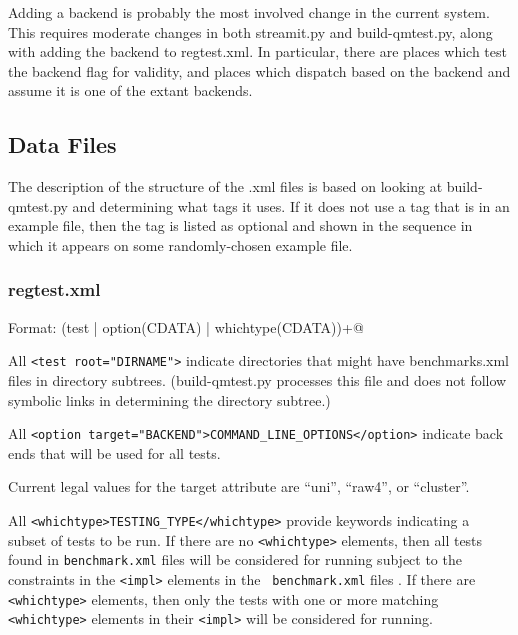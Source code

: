 \documentclass[11pt]{article}
\begin{document}
Adding a backend is probably the most involved change in the current
system.  This requires moderate changes in both \textsf{streamit.py}
and \textsf{build-qmtest.py}, along with adding the backend to
\textsf{regtest.xml}.  In particular, there are places which test the
backend flag for validity, and places which dispatch based on the
backend and assume it is one of the extant backends.

\subsection{Data Files}
The description of the structure of the .xml files is based on looking
at build-qmtest.py and determining what tags it uses.  If it does not
use a tag that is in an example file, then the tag is listed as
optional and shown in the sequence in which it appears on some
randomly-chosen example file.

\subsubsection{regtest.xml}
Format: \verb@regtest (test | option(CDATA) | whichtype(CDATA))+@

All \verb+<test root="DIRNAME">+ indicate directories that might have 
benchmarks.xml files in directory subtrees. (build-qmtest.py processes
this file and does not follow symbolic links in determining the
directory subtree.)

All \verb+<option target="BACKEND">COMMAND_LINE_OPTIONS</option>+
indicate back ends that will be used for all tests.

Current legal values for the target attribute are  ``uni'', ``raw4'', or 
``cluster''.

All \verb+<whichtype>TESTING_TYPE</whichtype>+ provide keywords indicating a 
subset of tests to be run.
If there are no \verb+<whichtype>+ elements, then all tests found in
{\tt benchmark.xml} files will be considered for running subject to
the constraints in the \verb+<impl>+ elements in the {\tt
benchmark.xml} files .
If there are \verb+<whichtype>+ elements, then only the tests with one
or more matching \verb+<whichtype>+ elements in their \verb+<impl>+
will be considered for running.
\end{document}
